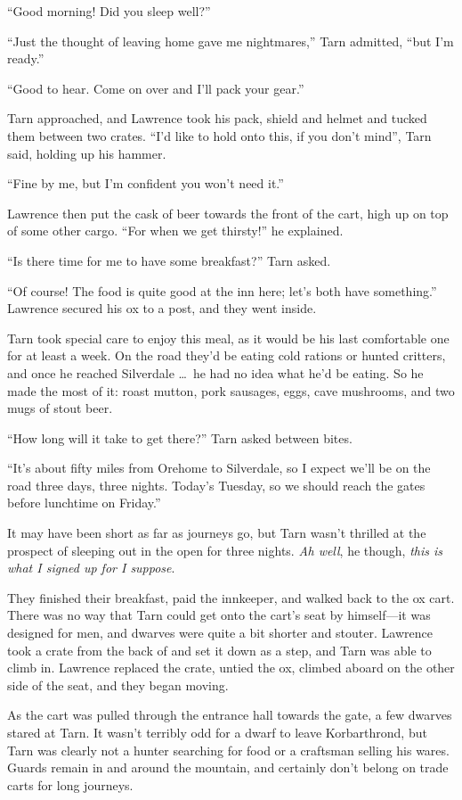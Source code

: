 ``Good morning!  Did you sleep well?''

``Just the thought of leaving home gave me nightmares,'' Tarn admitted, ``but I'm ready.''

``Good to hear.  Come on over and I'll pack your gear.''

Tarn approached, and Lawrence took his pack, shield and helmet and tucked them between two crates.  ``I'd like to hold onto this, if you don't mind'', Tarn said, holding up his hammer.

``Fine by me, but I'm confident you won't need it.''

Lawrence then put the cask of beer towards the front of the cart, high up on top of some other cargo.  ``For when we get thirsty!'' he explained.

``Is there time for me to have some breakfast?'' Tarn asked.

``Of course!  The food is quite good at the inn here; let's both have something.''  Lawrence secured his ox to a post, and they went inside.

Tarn took special care to enjoy this meal, as it would be his last comfortable one for at least a week.  On the road they'd be eating cold rations or hunted critters, and once he reached Silverdale \ldots\ he had no idea what he'd be eating.  So he made the most of it: roast mutton, pork sausages, eggs, cave mushrooms, and two mugs of stout beer.

``How long will it take to get there?'' Tarn asked between bites.

``It's about fifty miles from Orehome to Silverdale, so I expect we'll be on the road three days, three nights.  Today's Tuesday, so we should reach the gates before lunchtime on Friday.''

It may have been short as far as journeys go, but Tarn wasn't thrilled at the prospect of sleeping out in the open for three nights.  \emph{Ah well}, he though, \emph{this is what I signed up for I suppose}.

They finished their breakfast, paid the innkeeper, and walked back to the ox cart.
There was no way that Tarn could get onto the cart's seat by himself---it was designed for men, and dwarves were quite a bit shorter and stouter.  Lawrence took a crate from the back of and set it down as a step, and Tarn was able to climb in.  Lawrence replaced the crate, untied the ox, climbed aboard on the other side of the seat, and they began moving.

As the cart was pulled through the entrance hall towards the gate, a few dwarves stared at Tarn.  It wasn't terribly odd for a dwarf to leave Korbarthrond, but Tarn was clearly not a hunter searching for food or a craftsman selling his wares.  Guards remain in and around the mountain, and certainly don't belong on trade carts for long journeys.

